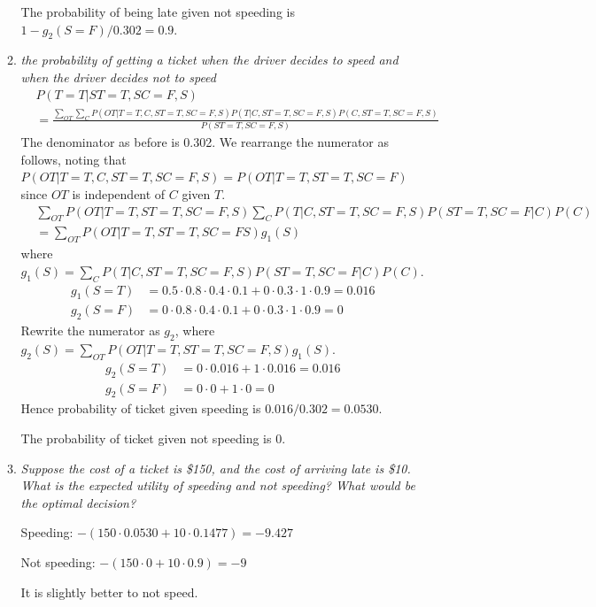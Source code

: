 \documentclass{article}
\begin{document}
\begin{enumerate}[(a)]
\begin{enumerate}
    The probability of being late given not speeding is $1-g_2(S=F)/0.302=0.9$.

  \item \textit{the probability of getting a ticket when the driver
    decides to speed and when the driver decides not to speed}
    \begin{align*}
    &P(T=T|ST=T,SC=F,S)\\
    &=\frac{\sum_{OT}\sum_C P(OT|T=T,C,ST=T,SC=F,S)P(T|C,ST=T,SC=F,S)P(C,ST=T,SC=F,S)}{P(ST=T,SC=F,S)}
    \end{align*}
    The denominator as before is 0.302. We rearrange the numerator as follows, noting that 
    $P(OT|T=T,C,ST=T,SC=F,S)=P(OT|T=T,ST=T,SC=F)$ since $OT$ is independent of $C$ given $T$.
    \begin{align*}
    &\sum_{OT} P(OT|T=T,ST=T,SC=F,S)\sum_C P(T|C,ST=T,SC=F,S)P(ST=T,SC=F|C)P(C)\\
    &=\sum_{OT} P(OT|T=T,ST=T,SC=FS)g_1(S)
    \end{align*}
    where $g_1(S)=\sum_C P(T|C,ST=T,SC=F,S)P(ST=T,SC=F|C)P(C)$.
    \begin{align*}
    g_1(S=T)&=0.5\cdot 0.8\cdot 0.4\cdot 0.1+0\cdot 0.3\cdot 1\cdot 0.9=0.016\\
    g_2(S=F)&=0\cdot 0.8\cdot 0.4\cdot 0.1+0\cdot 0.3\cdot 1\cdot 0.9=0
    \end{align*}
    Rewrite the numerator as $g_2$, where $g_2(S)=\sum_{OT}P(OT|T=T,ST=T,SC=F,S)g_1(S)$.
    \begin{align*}
    g_2(S=T)&=0\cdot 0.016+1\cdot 0.016=0.016\\
    g_2(S=F)&=0\cdot 0+1\cdot 0=0
    \end{align*}
    Hence probability of ticket given speeding is $0.016/0.302=0.0530$.

    The probability
    of ticket given not speeding is 0. 


  \item \textit{Suppose the cost of a ticket is \$150, and the cost of
    arriving late is \$10. What is the expected utility of speeding
    and not speeding?  What would be the optimal decision?}

    Speeding: $-(150\cdot 0.0530 +10\cdot 0.1477)=-9.427$

    Not speeding: $-(150\cdot 0 +10\cdot 0.9)=-9$
    
    It is slightly better to not speed. 

  \end{enumerate}

\end{enumerate}
\end{document}
